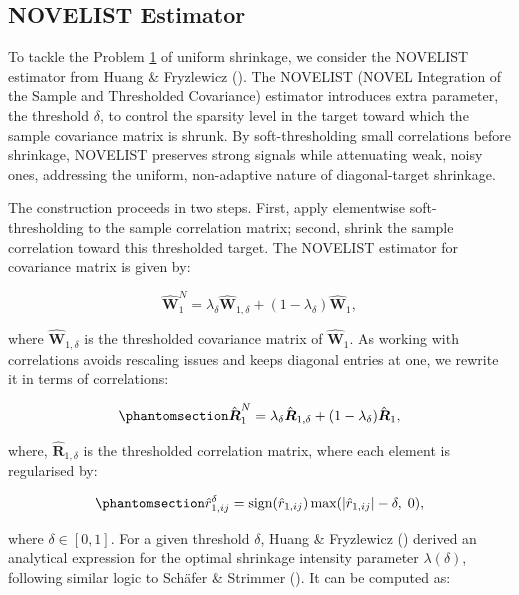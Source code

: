 \documentclass[
  11pt,
  letterpaper,
  DIV=11,
  numbers=noendperiod,
  titlepage]{scrartcl}
\begin{document}
\subsection{NOVELIST Estimator}\label{novelist-estimator}

To tackle the Problem \hyperref[prob1]{1} of uniform shrinkage, we
consider the NOVELIST estimator from Huang \& Fryzlewicz
(). The NOVELIST (NOVEL Integration of
the Sample and Thresholded Covariance) estimator introduces extra
parameter, the threshold \(\delta\), to control the sparsity level in
the target toward which the sample covariance matrix is shrunk. By
soft-thresholding small correlations before shrinkage, NOVELIST
preserves strong signals while attenuating weak, noisy ones, addressing
the uniform, non-adaptive nature of diagonal-target shrinkage.

The construction proceeds in two steps. First, apply elementwise
soft-thresholding to the sample correlation matrix; second, shrink the
sample correlation toward this thresholded target. The NOVELIST
estimator for covariance matrix is given by:

\[
\hat{\boldsymbol{W}}^{N}_{1} = \lambda_{\delta} \hat{\boldsymbol{W}}_{1, \delta} + (1 - \lambda_{\delta}) \hat{\boldsymbol{W}}_1,
\]

where \(\hat{\boldsymbol{W}}_{1, \delta}\) is the thresholded covariance
matrix of \(\hat{\boldsymbol{W}}_{1}\). As working with correlations
avoids rescaling issues and keeps diagonal entries at one, we rewrite it
in terms of correlations:

\begin{equation}\phantomsection\label{eq-novelist-cor}{
\hat{\boldsymbol{R}}^{N}_{1} = \lambda_{\delta} \hat{\boldsymbol{R}}_{1,\delta} + (1 - \lambda_{\delta}) \hat{\boldsymbol{R}}_1,
}\end{equation}

where, \(\hat{\boldsymbol{R}}_{1,\delta}\) is the thresholded
correlation matrix, where each element is regularised by:

\begin{equation}\phantomsection\label{eq-soft-thr}{
\hat{r}_{1,ij}^\delta = \text{sign}(\hat{r}_{1,ij}) \, 
\text{max}(|\hat{r}_{1,ij}| - \delta, \; 0),
}\end{equation}

where \(\delta \in [0,1]\). For a given threshold \(\delta\), Huang \&
Fryzlewicz () derived an analytical
expression for the optimal shrinkage intensity parameter
\(\lambda(\delta)\), following similar logic to Schäfer \& Strimmer
(). It can be computed as:
\end{document}
